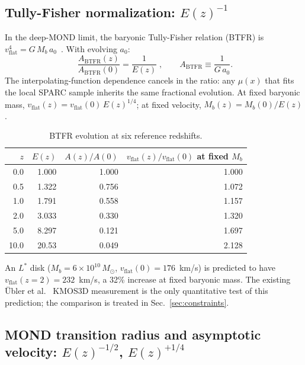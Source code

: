 \documentclass[
    aps,
    prd,
    reprint,
    superscriptaddress,
    nofootinbib,
    floatfix
]{revtex4-2}
\begin{document}
\subsection{Tully-Fisher normalization: $E(z)^{-1}$}
\label{sec:btfr}

In the deep-MOND limit, the baryonic Tully-Fisher relation (BTFR) is
$v_\text{flat}^4 = G\,M_b\,a_0$~\cite{Lelli2016}. With evolving $a_0$:
\begin{equation}
\boxed{\;\frac{A_\text{BTFR}(z)}{A_\text{BTFR}(0)}
       = \frac{1}{E(z)}\;},
\qquad A_\text{BTFR} \equiv \frac{1}{G\,a_0}.
\label{eq:btfr-shift}
\end{equation}
The interpolating-function dependence cancels in the ratio: any
$\mu(x)$ that fits the local SPARC sample inherits the same fractional
evolution. At fixed baryonic mass,
$v_\text{flat}(z) = v_\text{flat}(0)\,E(z)^{1/4}$; at fixed velocity,
$M_b(z) = M_b(0)/E(z)$.

\begin{table}[tb]
\caption{\label{tab:btfr}BTFR evolution at six reference redshifts.}
\begin{ruledtabular}
\begin{tabular}{rrrr}
$z$ & $E(z)$ & $A(z)/A(0)$
    & $v_\text{flat}(z)/v_\text{flat}(0)$ at fixed $M_b$ \\
\hline
0.0  & 1.000  & 1.000 & 1.000 \\
0.5  & 1.322  & 0.756 & 1.072 \\
1.0  & 1.791  & 0.558 & 1.157 \\
2.0  & 3.033  & 0.330 & 1.320 \\
5.0  & 8.297  & 0.121 & 1.697 \\
10.0 & 20.53  & 0.049 & 2.128 \\
\end{tabular}
\end{ruledtabular}
\end{table}

An $L^*$ disk ($M_b = 6 \times 10^{10}\,M_\odot$,
$v_\text{flat}(0) = 176$~km/s) is predicted to have
$v_\text{flat}(z=2) = 232$~km/s, a 32\% increase at fixed baryonic
mass. The existing \"Ubler et al.~\cite{Ubler2017} KMOS3D measurement
is the only quantitative test of this prediction; the comparison is
treated in Sec.~\ref{sec:constraints}.

\subsection{MOND transition radius and asymptotic velocity:
$E(z)^{-1/2}$, $E(z)^{+1/4}$}
\label{sec:rotation}
\end{document}
